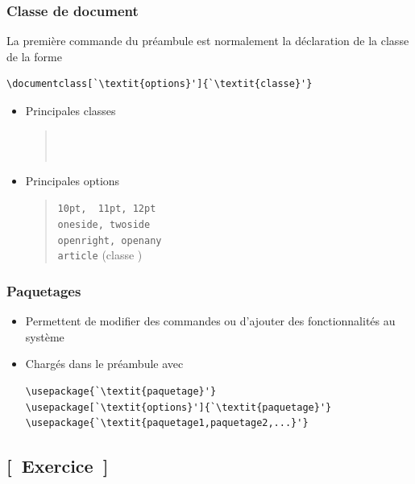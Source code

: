 \begin{frame}[fragile]
  \frametitle{Classe de document}

  La première commande du préambule est normalement la déclaration de
  la classe de la forme
\begin{lstlisting}
\documentclass[`\textit{options}']{`\textit{classe}'}
\end{lstlisting}

  \begin{itemize}
  \item Principales classes
    \begin{quote}
       \\
      {\color{alert} } \\
      {\color{alert} }
    \end{quote}
  \item Principales options
    \begin{quote}
      \texttt{10pt, {\color{alert} 11pt}, 12pt} \\
      \texttt{oneside, twoside} \\
      \texttt{openright, openany} \\
      {\color{alert} \texttt{article}} (classe )
    \end{quote}
  \end{itemize}
\end{frame}

\begin{frame}[fragile=singleslide]
  \frametitle{Paquetages}
  \begin{itemize}
  \item Permettent de modifier des commandes ou d'ajouter des
    fonctionnalités au système
  \item Chargés dans le préambule avec
    \begin{lstlisting}
\usepackage{`\textit{paquetage}'}
\usepackage[`\textit{options}']{`\textit{paquetage}'}
\usepackage{`\textit{paquetage1,paquetage2,...}'}
    \end{lstlisting}
  \end{itemize}
\end{frame}

\subsection{[~Exercice~]}

